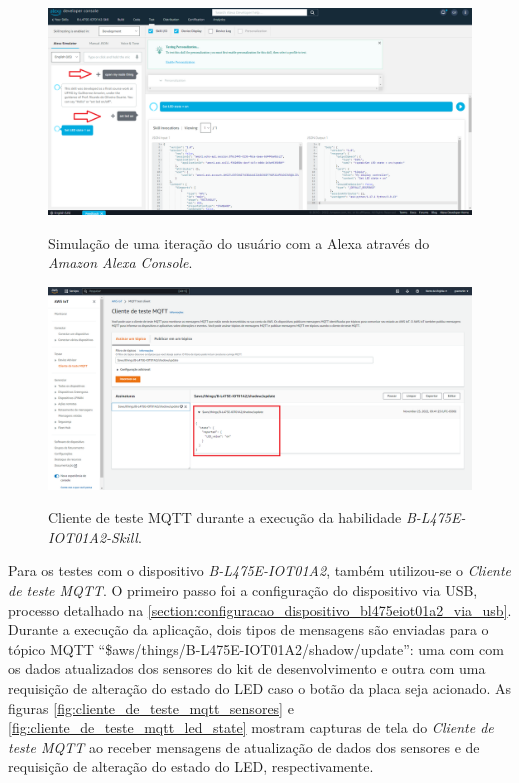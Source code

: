 \begin{figure}[htbp]
    \centering
    \caption{Simulação de uma iteração do usuário com a Alexa através do \textit{Amazon Alexa Console}.}
    \includegraphics[scale=0.315]{Imagens/alexa_developer_console.png}
    \label{fig:alexa_developer_console}
\end{figure}

\begin{figure}[htbp]
    \centering
    \caption{Cliente de teste MQTT durante a execução da habilidade \textit{B-L475E-IOT01A2-Skill}.}
    \includegraphics[scale=0.315]{Imagens/cliente_de_teste_mqtt.png}
    \label{fig:cliente_de_teste_mqtt}
\end{figure}

Para os testes com o dispositivo \textit{B-L475E-IOT01A2}, também utilizou-se o \textit{Cliente de teste MQTT}. O primeiro passo foi a configuração do dispositivo via USB, processo detalhado na \autoref{section:configuracao_dispositivo_bl475eiot01a2_via_usb}. Durante a execução da aplicação, dois tipos de mensagens são enviadas para o tópico MQTT ``\$aws/things/B-L475E-IOT01A2/shadow/update'': uma com com os dados atualizados dos sensores do kit de desenvolvimento e outra com uma requisição de alteração do estado do LED caso o botão da placa seja acionado. As figuras \autoref{fig:cliente_de_teste_mqtt_sensores} e \autoref{fig:cliente_de_teste_mqtt_led_state} mostram capturas de tela do \textit{Cliente de teste MQTT} ao receber mensagens de atualização de dados dos sensores e de requisição de alteração do estado do LED, respectivamente.

